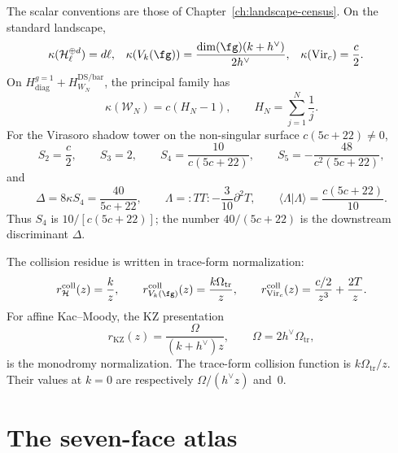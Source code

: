 The scalar conventions are those of
Chapter~\ref{ch:landscape-census}.  On the standard landscape,
\[
\begin{aligned}
\kappa(\mathcal H_\ell^{\oplus d}) &= d\ell,
&
\kappa(V_k(\fg)) &=
\frac{\dim(\fg)(k+h^\vee)}{2h^\vee},
&
\kappa(\mathrm{Vir}_c) &= \frac c2.
\end{aligned}
\]
On
$H_{\mathrm{diag}}^{g=1}+H_{W_N}^{\mathrm{DS/bar}}$, the principal
family has
\[
\kappa(\mathcal W_N)=c(H_N-1),
\qquad
H_N=\sum_{j=1}^{N}\frac1j.
\]
For the Virasoro shadow tower on the non-singular surface
$c(5c+22)\neq 0$,
\[
S_2=\frac c2,\qquad
S_3=2,\qquad
S_4=\frac{10}{c(5c+22)},\qquad
S_5=-\frac{48}{c^2(5c+22)},
\]
and
\[
\Delta=8\kappa S_4=\frac{40}{5c+22},\qquad
\Lambda={:}TT{:}-\frac{3}{10}\partial^2T,\qquad
\langle\Lambda|\Lambda\rangle=\frac{c(5c+22)}{10}.
\]
Thus $S_4$ is $10/[c(5c+22)]$; the number
$40/(5c+22)$ is the downstream discriminant $\Delta$.

The collision residue is written in trace-form normalization:
\[
r_{\mathcal H}^{\mathrm{coll}}(z)=\frac{k}{z},\qquad
r_{V_k(\fg)}^{\mathrm{coll}}(z)=\frac{k\Omega_{\mathrm{tr}}}{z},
\qquad
r_{\mathrm{Vir}_c}^{\mathrm{coll}}(z)=\frac{c/2}{z^3}+\frac{2T}{z}.
\]
For affine Kac--Moody, the KZ presentation
\[
r_{\mathrm{KZ}}(z)=\frac{\Omega}{(k+h^\vee)z},
\qquad
\Omega=2h^\vee\Omega_{\mathrm{tr}},
\]
is the monodromy normalization.  The trace-form collision function is
$k\Omega_{\mathrm{tr}}/z$.  Their values at $k=0$ are respectively
$\Omega/(h^\vee z)$ and~$0$.

\section{The seven-face atlas}
\label{sec:master-concordance-seven-faces}

